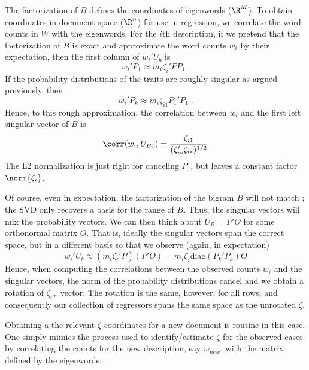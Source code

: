 \documentclass[10pt]{article}
\begin{document}
 The factorization of $B$ defines the coordinates of eigenwords ($\R^M$).  To
 obtain coordinates in document space ($\R^n$) for use in regression, we  correlate  the word counts in $W$ with the eigenwords.  For the $i$th description, if we pretend that the factorization of $B$ is exact and approximate the word counts $w_i$ by their expectation, then the first column of $w_i' U_b$ is
 \begin{displaymath}
    w_i'P_1 \approx m_i \zeta_i' P P_1 \;.
 \end{displaymath}
 If the probability distributions of the traits are roughly singular as argued previously, then
 \begin{displaymath}
    w_i'P_k \approx m_i \zeta_{i1} P_1'P_1 \;.
 \end{displaymath}
 Hence, to this rough approximation, the correlation between $w_i$ and the first
 left singular vector of $B$ is
 \begin{displaymath}
    \corr(w_i, U_{B1}) = \frac{\zeta_{i1}}{(\zeta_{i*}'\zeta_{i*})^{1/2}}   
 \end{displaymath}
 The L2 normalization is just right for canceling $P_1$, but leaves a constant
 factor $\norm{\zeta_i}$.

 
 Of course, even in expectation, the factorization of the bigram $B$ will not
 match  ; the SVD  only recovers a basis for the range of $B$.  Thus, the 
 singular vectors will mix the probability vectors.  We can
 then think about $U_B = P'O$ for some orthonormal matrix $O$.  That is, ideally
 the singular vectors span the correct space, but in a different basis so that
 we observe (again, in expectation)
 \begin{displaymath}
   w_i'U_b \approx (m_i \zeta_i'P)(P'O) = m_i \zeta_i \mbox{diag}(P_k'P_k) O
 \end{displaymath}
 Hence, when computing the correlations between the observed counts $w_i$ and the
 singular vectors, the norm of the probability distributions cancel and we
 obtain a rotation of  $\zeta_{i*}$ vector.  The rotation is the same, however,
 for all rows, and consequently our collection of regressors spans the same
 space as the unrotated $\zeta$.


 Obtaining a the relevant $\zeta$-coordinates for a new document is routine in
 this case.  One simply mimics the process used to identify/estimate $\zeta$ for
 the observed cases by correlating the counts for the new description, say
 $w_{new}$, with the matrix defined by the eigenwords.
\end{document}
